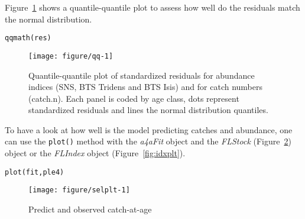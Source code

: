 \documentclass[a4paper,english,10pt]{article}\usepackage[]{graphicx}\usepackage[]{color}
\makeatletter
\def\maxwidth{ %
  \ifdim\Gin@nat@width>\linewidth
    \linewidth
  \else
    \Gin@nat@width
  \fi
}
\newcommand{\hlstd}[1]{\textcolor[rgb]{0,0,0}{#1}}%
\newcommand{\hlkwd}[1]{\textcolor[rgb]{0.361,0.506,0.596}{#1}}%
\newenvironment{kframe}{%
 \def\at@end@of@kframe{}%
 \ifinner\ifhmode%
  \def\at@end@of@kframe{\end{minipage}}%
  \begin{minipage}{\columnwidth}%
 \fi\fi%
 \def\FrameCommand##1{\hskip\@totalleftmargin \hskip-\fboxsep
 \colorbox{shadecolor}{##1}\hskip-\fboxsep
     \hskip-\linewidth \hskip-\@totalleftmargin \hskip\columnwidth}%
 \MakeFramed {\advance\hsize-\width
   \@totalleftmargin\z@ \linewidth\hsize
   \@setminipage}}%
 {\par\unskip\endMakeFramed%
 \at@end@of@kframe}
\newenvironment{knitrout}{}{} %
\newcommand{\code}[1]{{\texttt{#1}}}
\newcommand{\class}[1]{{\textit{#1}}}
\makeatother
\begin{document}
Figure~\ref{fig:qq} shows a quantile-quantile plot to assess how well do the residuals match the normal distribution.

\begin{knitrout}
\color{fgcolor}\begin{kframe}
\begin{alltt}
\hlkwd{qqmath}\hlstd{(res)}
\end{alltt}
\end{kframe}\begin{figure}[H]

{\centering \texttt{[image: figure/qq-1]} 

}

\caption[Quantile-quantile plot of standardized residuals for abundance indices (SNS, BTS Tridens and BTS Isis) and for catch numbers (catch]{Quantile-quantile plot of standardized residuals for abundance indices (SNS, BTS Tridens and BTS Isis) and for catch numbers (catch.n). Each panel is coded by age class, dots represent standardized residuals and lines the normal distribution quantiles.\label{fig:qq}}
\end{figure}


\end{knitrout}

To have a look at how well is the model predicting catches and abundance, one can use the \code{plot()} method with the \class{a4aFit} object and the \class{FLStock} (Figure~\ref{fig:selplt}) object or the \class{FLIndex} object (Figure~\ref{fig:idxplt}).

\begin{knitrout}
\color{fgcolor}\begin{kframe}
\begin{alltt}
\hlkwd{plot}\hlstd{(fit, ple4)}
\end{alltt}
\end{kframe}\begin{figure}[H]

{\centering \texttt{[image: figure/selplt-1]} 

}

\caption[Predict and observed catch-at-age]{Predict and observed catch-at-age\label{fig:selplt}}
\end{figure}


\end{knitrout}
\end{document}
